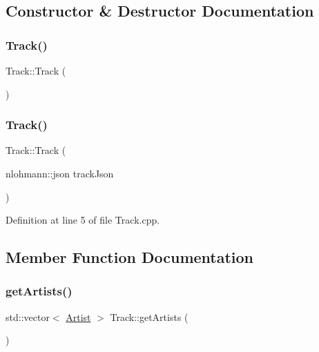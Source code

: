 \subsection{Constructor \& Destructor Documentation}
\mbox{\label{class_track_a11457bcda8be04595018c11173d8241c}} 
\subsubsection{\texorpdfstring{Track()}{Track()}\hspace{0.1cm}{\footnotesize\ttfamily [1/2]}}
{\footnotesize\ttfamily Track\+::\+Track (\begin{DoxyParamCaption}{ }\end{DoxyParamCaption})\hspace{0.3cm}{\ttfamily [default]}}

\mbox{\label{class_track_a550f395a3633d7929a6a28cb2d301d1b}} 
\subsubsection{\texorpdfstring{Track()}{Track()}\hspace{0.1cm}{\footnotesize\ttfamily [2/2]}}
{\footnotesize\ttfamily Track\+::\+Track (\begin{DoxyParamCaption}\item[{nlohmann\+::json}]{track\+Json }\end{DoxyParamCaption})}



Definition at line 5 of file Track.\+cpp.



\subsection{Member Function Documentation}
\mbox{\label{class_track_a8192c046c7ac1c6c2131d62ab2e979c1}} 
\subsubsection{\texorpdfstring{get\+Artists()}{getArtists()}}
{\footnotesize\ttfamily std\+::vector$<$ \mbox{\hyperlink{class_artist}{Artist}} $>$ Track\+::get\+Artists (\begin{DoxyParamCaption}{ }\end{DoxyParamCaption})}



